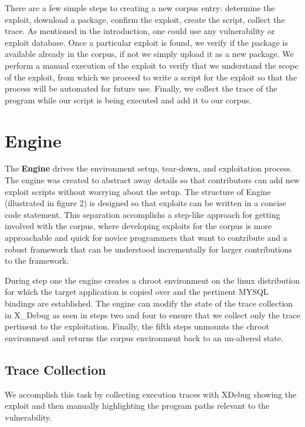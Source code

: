 \documentclass[letterpaper,twocolumn,10pt]{article}
\begin{document}
There are a few simple steps to creating a new corpus entry: determine the exploit, download a package, confirm the exploit, create the script, collect the trace.  As mentioned in the introduction, one could use any vulnerability or exploit database.   Once a particular exploit is found, we verify if the package is available already in the corpus, if not we simply upload it as a new package.  We perform a manual execution of the exploit to verify that we understand the scope of the exploit, from which we proceed to write a script for the exploit so that the process will be automated for future use.  Finally, we collect the trace of the program while our script is being executed and add it to our corpus.


\section{Engine}
The {\bf Engine} drives the environment setup, tear-down, and exploitation process.  The engine was created to abstract away details so that contributors can add new exploit scripts without worrying about the setup. The structure of Engine (illustrated in figure 2) is designed so that exploits can be written in a concise code statement.  This separation accomplishs a step-like approach for getting involved with the corpus, where developing exploits for the corpus is more approachable and quick for novice programmers that want to contribute and a robust framework that can be understood incrementally for larger contributions to the framework.\par

During step one the engine creates a chroot environment on the linux distribution for which the target application is copied over and the pertinent MYSQL bindings are established.  The engine can modify the state of the trace collection in X\_Debug as seen in steps two and four to ensure that we collect only the trace pertinent to the exploitation.  Finally, the fifth steps unmounts the chroot environment and returns the corpus environment back to an un-altered state.


\subsection{Trace Collection}


We accomplish this task by collecting execution traces with XDebug showing the exploit and then manually highlighting the program paths relevant to the vulnerability.
\end{document}
